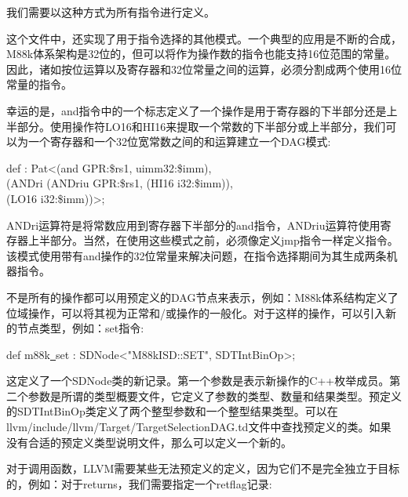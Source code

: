 我们需要以这种方式为所有指令进行定义。\par

这个文件中，还实现了用于指令选择的其他模式。一个典型的应用是不断的合成，M88k体系架构是32位的，但可以将作为操作数的指令也能支持16位范围的常量。因此，诸如按位运算以及寄存器和32位常量之间的运算，必须分割成两个使用16位常量的指令。\par

幸运的是，and指令中的一个标志定义了一个操作是用于寄存器的下半部分还是上半部分。使用操作符LO16和HI16来提取一个常数的下半部分或上半部分，我们可以为一个寄存器和一个32位宽常数之间的和运算建立一个DAG模式:\par

\begin{tcolorbox}[colback=white,colframe=black]
def : Pat<(and GPR:\$rs1, uimm32:\$imm), \\
\hspace*{2cm}(ANDri (ANDriu GPR:\$rs1, (HI16 i32:\$imm)), \\
\hspace*{6cm}(LO16 i32:\$imm))>;
\end{tcolorbox}

ANDri运算符是将常数应用到寄存器下半部分的and指令，ANDriu运算符使用寄存器上半部分。当然，在使用这些模式之前，必须像定义jmp指令一样定义指令。该模式使用带有and操作的32位常量来解决问题，在指令选择期间为其生成两条机器指令。\par

不是所有的操作都可以用预定义的DAG节点来表示，例如：M88k体系结构定义了位域操作，可以将其视为正常和/或操作的一般化。对于这样的操作，可以引入新的节点类型，例如：set指令:\par

\begin{tcolorbox}[colback=white,colframe=black]
def m88k\underline{~}set : SDNode<"M88kISD::SET", SDTIntBinOp>;
\end{tcolorbox}

这定义了一个SDNode类的新记录。第一个参数是表示新操作的C++枚举成员。第二个参数是所谓的类型概要文件，它定义了参数的类型、数量和结果类型。预定义的SDTIntBinOp类定义了两个整型参数和一个整型结果类型。可以在llvm/include/llvm/Target/TargetSelectionDAG.td文件中查找预定义的类。如果没有合适的预定义类型说明文件，那么可以定义一个新的。\par

对于调用函数，LLVM需要某些无法预定义的定义，因为它们不是完全独立于目标的，例如：对于returns，我们需要指定一个retflag记录:\par


